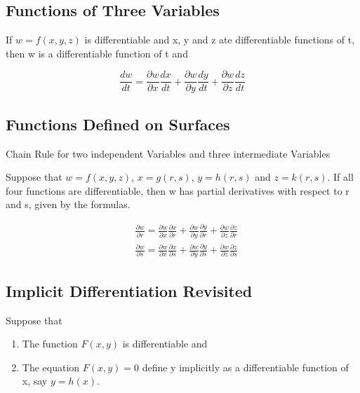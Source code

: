 \documentclass[12pt,a4paper]{article}
\newenvironment{theorem}{\begin{theorembox}}{\end{theorembox}\vspace{1\baselineskip}}
\begin{document}
\subsection{Functions of Three Variables}

\begin{theorem}
    If \(w = f(x,y,z)\) is differentiable and x, y and z ate differentiable functions of t, then w is a differentiable function of t and
    
    \[\frac{d w}{d t}=\frac{\partial w}{\partial x} \frac{d x}{d t}+\frac{\partial w}{\partial y} \frac{d y}{d t}+\frac{\partial w}{\partial z} \frac{d z}{d t}\]

\end{theorem}

\subsection{Functions Defined on Surfaces}

\begin{theorem}
    Chain Rule for two independent Variables and three intermediate Variables

    Suppose that \(w = f(x,y,z)\), \(x= g(r,s)\), \(y= h(r,s)\) and \(z= k(r,s)\). If all four
    functions are differentiable, then w has partial derivatives with respect to r and s,
    given by the formulas.

    \[\begin{aligned}
        & \frac{\partial w}{\partial r}=\frac{\partial w}{\partial x} \frac{\partial x}{\partial r}+\frac{\partial w}{\partial y} \frac{\partial y}{\partial r}+\frac{\partial w}{\partial z} \frac{\partial z}{\partial r} \\
        & \frac{\partial w}{\partial s}=\frac{\partial w}{\partial x} \frac{\partial x}{\partial s}+\frac{\partial w}{\partial y} \frac{\partial y}{\partial s}+\frac{\partial w}{\partial z} \frac{\partial z}{\partial s}
        \end{aligned}\]

\end{theorem}



\subsection{Implicit Differentiation Revisited}

Suppose that

\begin{enumerate}
    \item The function \(F(x,y)\) is differentiable and
    \item The equation \(F(x,y) = 0\) define y implicitly as a differentiable function of x, say \(y= h(x)\).

\end{enumerate}
\end{document}
